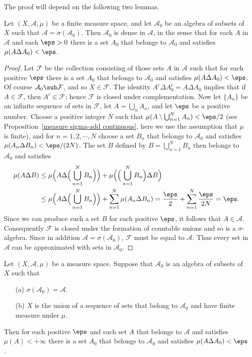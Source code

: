 The proof will depend on the following two lemmas.
\begin{lemma}\label{sigma-algebra generator is dense finite case}
Let $(X,\mathcal{A},\mu)$ be a finite measure space, and let $\mathcal{A}_0$ be an algebra of subsets of $X$ such that $\mathcal{A}=\sigma(\mathcal{A}_0)$. Then $\mathcal{A}_0$ is dense in $\mathcal{A}$, in the sense that for each $A$ in $\mathcal{A}$ and each $\eps>0$ there is a set $A_0$ that belongs to $\mathcal{A}_0$ and satisfies $\mu(A\Delta A_0)<\eps$.
\end{lemma}
\begin{proof}
Let $\mathcal{F}$ be the collection consisting of those sets $A$ in $\mathcal{A}$ such that for each positive $\eps$ there is a set $A_0$ that belongs to $\mathcal{A}_0$ and satisfies $\mu(A\Delta A_0)<\eps$. Of course $\mathcal{A}_0\sub\mathcal{F}$, and so $X\in\mathcal{F}$. The identity $A^c\Delta A_0^c=A\Delta A_0$ implies that if $A\in\mathcal{F}$, then $A^c\in\mathcal{F}$; hence $\mathcal{F}$ is closed under complementation. Now let $\{A_n\}$ be an infinite sequence of sets in $\mathcal{F}$, let $A=\bigcup_nA_n$, and let $\eps$ be a positive number. Choose a positive integer $N$ such that $\mu(A\setminus\bigcup_{n=1}^{N}A_n)<\eps/2$ (see Proposition~\ref{measure sigma-add continuous}, here we use the assumption that $\mu$ is finite), and for $n=1,2,\cdots,N$ choose a set $B_n$ that belongs to $\mathcal{A}_0$ and satisfies $\mu(A_n\Delta B_n)<\eps/(2N)$. The set $B$ defined by $B=\bigcup_{n=1}^{N}B_n$ then belongs to $\mathcal{A}_0$ and satisfies
\begin{align*}
\mu(A\Delta B)&\leq\mu\Big(A\Delta\Big(\bigcup_{n=1}^{N}B_n\Big)\Big)+\mu\Big(\Big(\bigcup_{n=1}^{N}B_n\Big)\Delta B\Big)\\
&\leq\mu\Big(A\Delta\Big(\bigcup_{n=1}^{N}B_n\Big)\Big)+\sum_{n=1}^{N}\mu(A_n\Delta B_n)=\frac{\eps}{2}+\sum_{n=1}^{N}\frac{\eps}{2N}=\eps.
\end{align*}
Since we can produce such a set $B$ for each positive $\eps$, it follows that $A\in\mathcal{A}$. Consequently $\mathcal{F}$ is closed under the formation of countable unions and so is a $\sigma$-algebra. Since in addition $\mathcal{A}=\sigma(\mathcal{A}_0)$, $\mathcal{F}$ must be equal to $\mathcal{A}$. Thus every set in $\mathcal{A}$ can be approximated with sets in $\mathcal{A}_0$.
\end{proof}
\begin{lemma}\label{sigma-algebra generator is dense sigma-finite case}
Let $(X,\mathcal{A},\mu)$ be a measure space. Suppose that $\mathcal{A}_0$ is an algebra of subsets of $X$ such that
\begin{itemize}
\item[(a)] $\sigma(\mathcal{A}_0)=\mathcal{A}$.
\item[(b)] $X$ is the union of a sequence of sets that belong to $\mathcal{A}_0$ and have finite measure under $\mu$.
\end{itemize}
Then for each positive $\eps$ and each set $A$ that belongs to $\mathcal{A}$ and satisfies $\mu(A)<+\infty$ there is a set $A_0$ that belongs to $\mathcal{A}_0$ and satisfies $\mu(A\Delta A_0)<\eps$.
\end{lemma}
